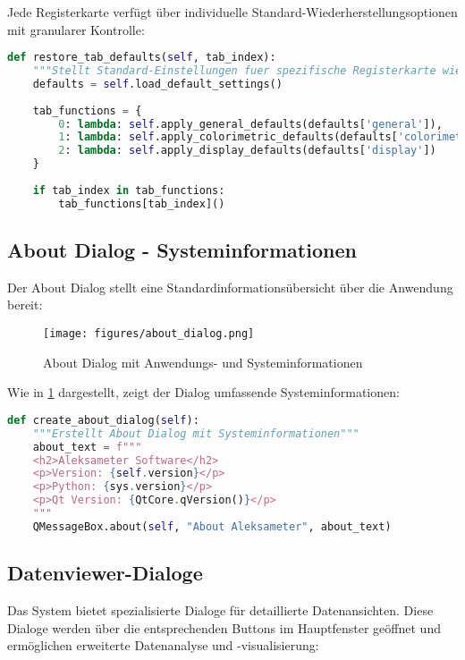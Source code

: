 Jede Registerkarte verfügt über individuelle Standard-Wiederherstellungsoptionen mit granularer Kontrolle:

\begin{lstlisting}[language=Python, caption=Tab-spezifische Default-Wiederherstellung]
def restore_tab_defaults(self, tab_index):
    """Stellt Standard-Einstellungen fuer spezifische Registerkarte wieder her"""
    defaults = self.load_default_settings()
    
    tab_functions = {
        0: lambda: self.apply_general_defaults(defaults['general']),
        1: lambda: self.apply_colorimetric_defaults(defaults['colorimetric']),
        2: lambda: self.apply_display_defaults(defaults['display'])
    }
    
    if tab_index in tab_functions:
        tab_functions[tab_index]()
\end{lstlisting}

\subsection{About Dialog - Systeminformationen}

Der About Dialog stellt eine Standardinformationsübersicht über die Anwendung bereit:

\begin{figure}[H]
    \centering
\texttt{[image: figures/about\_dialog.png]}
\caption{About Dialog mit Anwendungs- und Systeminformationen}
\label{fig:about_dialog}
\end{figure}

Wie in \ref{fig:about_dialog} dargestellt, zeigt der Dialog umfassende Systeminformationen:

\begin{lstlisting}[language=Python, caption=About Dialog Implementation]
def create_about_dialog(self):
    """Erstellt About Dialog mit Systeminformationen"""
    about_text = f"""
    <h2>Aleksameter Software</h2>
    <p>Version: {self.version}</p>
    <p>Python: {sys.version}</p>
    <p>Qt Version: {QtCore.qVersion()}</p>
    """
    QMessageBox.about(self, "About Aleksameter", about_text)
\end{lstlisting}

\subsection{Datenviewer-Dialoge}

Das System bietet spezialisierte Dialoge für detaillierte Datenansichten. Diese Dialoge werden über die entsprechenden Buttons im Hauptfenster geöffnet und ermöglichen erweiterte Datenanalyse und -visualisierung:

